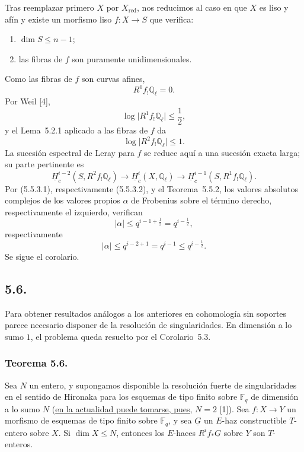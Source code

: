 \pageoriginale

Tras reemplazar primero $X$ por $X_{\mathrm{red}}$, nos reducimos al caso
en que $X$ es liso y afín y existe un morfismo liso
$f:X\longrightarrow S$ que verifica:
\begin{enumerate}[label=(\alph*)]
\item $\dim S\leq n-1$;
\item las fibras de $f$ son puramente unidimensionales.
\end{enumerate}
Como las fibras de $f$ son curvas afines,
\[
R^0f_!\mathbb Q_\ell=0.
\]
Por Weil [4],
\begin{equation}\tag{5.5.3.1}
\log\bigl|R^1f_!\mathbb Q_\ell\bigr|\leq\frac12,
\end{equation}
y el Lema~5.2.1 aplicado a las fibras de $f$ da
\begin{equation}\tag{5.5.3.2}
\log\bigl|R^2f_!\mathbb Q_\ell\bigr|\leq1.
\end{equation}
La sucesión espectral de Leray para $f$ se reduce aquí a una sucesión
exacta larga; su parte pertinente es
\[
\underline H_c^{i-2}(S,R^2f_!\mathbb Q_\ell)\longrightarrow
\underline H_c^i(X,\mathbb Q_\ell)\longrightarrow
\underline H_c^{i-1}(S,R^1f_!\mathbb Q_\ell).
\]
Por (5.5.3.1), respectivamente (5.5.3.2), y el Teorema~5.5.2, los valores
absolutos complejos de los valores propios $\alpha$ de Frobenius sobre el
término derecho, respectivamente el izquierdo, verifican
\[
|\alpha|\leq q^{i-1+\frac12}=q^{i-\frac12},
\]
respectivamente
\[
|\alpha|\leq q^{i-2+1}=q^{i-1}\leq q^{i-\frac12}.
\]
Se sigue el corolario.

\pageoriginale

\subsection*{5.6.}
Para obtener resultados análogos a los anteriores en cohomología sin
soportes parece necesario disponer de la resolución de singularidades.
En dimensión a lo sumo $1$, el problema queda resuelto por el
Corolario~5.3.

\subsubsection*{Teorema 5.6.}
Sea $N$ un entero, y supongamos disponible la resolución fuerte de
singularidades en el sentido de Hironaka para los esquemas de tipo finito
sobre $\mathbb F_q$ de dimensión a lo sumo $N$ (\underline{en la actualidad puede
tomarse, pues,} $N=2$ [1]). Sea $f:X\longrightarrow Y$ un morfismo de
esquemas de tipo finito sobre $\mathbb F_q$, y sea $\underline G$ un
$E$-haz constructible $T$-entero sobre $X$. Si $\dim X\leq N$, entonces
los $E$-haces $R^if_*\underline G$ sobre $Y$ son $T$-enteros.

